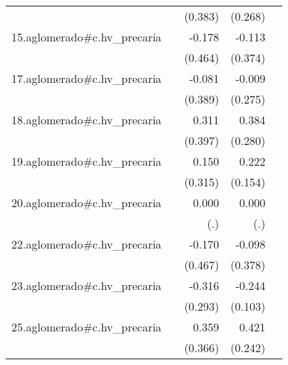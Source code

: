 {\begin{longtable}{l*{4}{D{.}{.}{-1}}}
            &                     &     (0.383)         &     (0.268)         &                     \\
\addlinespace
15.aglomerado#c.hv\_precaria&                     &      -0.178         &      -0.113         &                     \\
            &                     &     (0.464)         &     (0.374)         &                     \\
\addlinespace
17.aglomerado#c.hv\_precaria&                     &      -0.081         &      -0.009         &                     \\
            &                     &     (0.389)         &     (0.275)         &                     \\
\addlinespace
18.aglomerado#c.hv\_precaria&                     &       0.311         &       0.384         &                     \\
            &                     &     (0.397)         &     (0.280)         &                     \\
\addlinespace
19.aglomerado#c.hv\_precaria&                     &       0.150         &       0.222         &                     \\
            &                     &     (0.315)         &     (0.154)         &                     \\
\addlinespace
20.aglomerado#c.hv\_precaria&                     &       0.000         &       0.000         &                     \\
            &                     &         (.)         &         (.)         &                     \\
\addlinespace
22.aglomerado#c.hv\_precaria&                     &      -0.170         &      -0.098         &                     \\
            &                     &     (0.467)         &     (0.378)         &                     \\
\addlinespace
23.aglomerado#c.hv\_precaria&                     &      -0.316         &      -0.244\sym{*}  &                     \\
            &                     &     (0.293)         &     (0.103)         &                     \\
\addlinespace
25.aglomerado#c.hv\_precaria&                     &       0.359         &       0.421         &                     \\
            &                     &     (0.366)         &     (0.242)         &                     \\

\end{longtable}}
